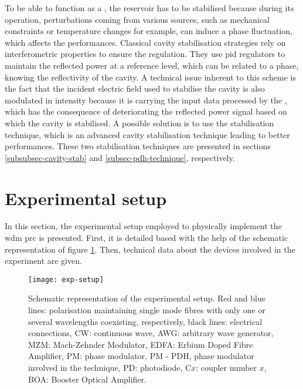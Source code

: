 To be able to function as a \rcer, the reservoir has to be stabilised because during its operation, perturbations coming from various sources, such as mechanical constraints or temperature changes for example, can induce a phase fluctuation, which affects the \rcer performances. Classical cavity stabilisation strategies rely on interferometric properties to ensure the regulation. They use \gls{pid} regulators to maintain the reflected power at a reference level, which can be related to a phase, knowing the reflectivity of the cavity. A technical issue inherent to this scheme is the fact that the incident electric field used to stabilise the cavity is also modulated in intensity because it is carrying the input data processed by the \rcer, which has the consequence of deteriorating the reflected power signal based on which the cavity is stabilised. A possible solution is to use the \pdh stabilisation technique, which is an advanced cavity stabilisation technique leading to better performances. These two stabilisation techniques are presented in sections \ref{subsubsec-cavity-stab} and \ref{subsec-pdh-technique}, respectively.


\section{Experimental setup}

In this section, the experimental setup employed to physically implement the \gls{wdm} \gls{prc} is presented. First, it is detailed based with the help of the schematic representation of figure \ref{exp-setup}. Then, technical data about the devices involved in the experiment are given.

\begin{figure}[h]
	\centering
	\texttt{[image: exp-setup]}
	\caption{Schematic representation of the experimental setup. Red and blue lines: polarisation maintaining single mode fibres with only one or several wavelengths coexisting, respectively, black lines: electrical connections, CW: continuous wave, AWG: arbitrary wave generator, MZM: Mach-Zehnder Modulator, EDFA: Erbium Doped Fibre Amplifier, PM: phase modulator, PM - PDH, phase modulator involved in the \pdh technique, PD: photodiode, C$x$: coupler number $x$, BOA: Booster Optical Amplifier.}
	\label{exp-setup}
\end{figure}


